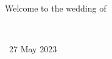 \documentclass[12pt]{article}
\begin{document}
\begin{minipage}[t]{0.495\textwidth}
\ 
\vspace{4.75cm}
\centering

\ \ \ \ \ \ \ \ \ \ \ \ \ \ \ \  \ \ \ \ \ \ \ \ \ \   {\Large Welcome to the wedding of}
\vspace*{.2in}


\newcommand{\exmpl}[2]{%
     #1&\cursive#2\relax The quick brown fox jumps over the lazy dog.}

\ \ \ \ \ \ \ \ \ \ \ \ \ \ \ \ \ \ \ \ \ \ \    {\LARGE  {}}
\vspace*{.2in}

\ \ \ \ \ \ \ \ \ \ \ \ \ \ \ \ \ \ \ \  \ \ \ \ \ \ \ {\large 27 May 2023}
\vspace*{.25in}
\end{minipage}


\end{document}
